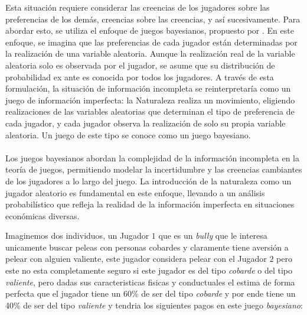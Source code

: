 \documentclass[11pt]{article}
\begin{document}
\begin{flushleft}
    Esta situación requiere considerar las creencias de los jugadores sobre las preferencias de los demás, creencias sobre las creencias, y así sucesivamente. Para abordar esto, se utiliza el enfoque de juegos bayesianos, propuesto por \citet{harsanyi1967games}. En este enfoque, se imagina que las preferencias de cada jugador están determinadas por la realización de una variable aleatoria. Aunque la realización real de la variable aleatoria solo es observada por el jugador, se asume que su distribución de probabilidad ex ante es conocida por todos los jugadores. A través de esta formulación, la situación de información incompleta se reinterpretaría como un juego de información imperfecta: la Naturaleza realiza un movimiento, eligiendo realizaciones de las variables aleatorias que determinan el tipo de preferencia de cada jugador, y cada jugador observa la realización de solo su propia variable aleatoria. Un juego de este tipo se conoce como un juego bayesiano.\\~\\

    Los juegos bayesianos abordan la complejidad de la información incompleta en la teoría de juegos, permitiendo modelar la incertidumbre y las creencias cambiantes de los jugadores a lo largo del juego. La introducción de la naturaleza como un jugador aleatorio es fundamental en este enfoque, llevando a un análisis probabilístico que refleja la realidad de la información imperfecta en situaciones económicas diversas.

    \begin{example}
        \begin{flushleft}
            Imaginemos dos individuos, un Jugador $1$ que es un \textit{bully} que le interesa unicamente buscar peleas con personas cobardes y claramente tiene aversión a pelear con alguien valiente, este jugador considera pelear con el Jugador $2$ pero este no esta completamente seguro si este jugador es del tipo \textit{cobarde} o del tipo \textit{valiente}, pero dadas sus caracteristicas fisicas y conductuales el estima de forma perfecta que el jugador tiene un 60\% de ser del tipo \textit{cobarde} y por ende tiene un 40\% de ser del tipo \textit{valiente} y tendria los siguientes pagos en este juego \textit{bayesiano}:\\
        

\end{flushleft}
\end{example}
\end{flushleft}
\end{document}
